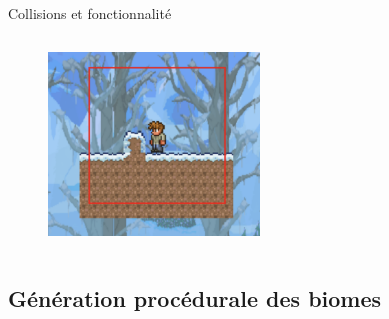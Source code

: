 \documentclass[aspectratio=169]{beamer}
\begin{document}
\begin{frame}{Collisions et fonctionnalité}
\begin{columns}
\begin{column}{0.5\textwidth}
\begin{figure}
            \end{figure}
            \begin{figure}
                \centering
                \captionsetup{format=sanslabel}
                \includegraphics[width=0.5\textwidth]{assets/camera.png}
            \end{figure}
        \end{column}
    \end{columns}
\end{frame}

\subsection{Génération procédurale des biomes}
\end{document}
